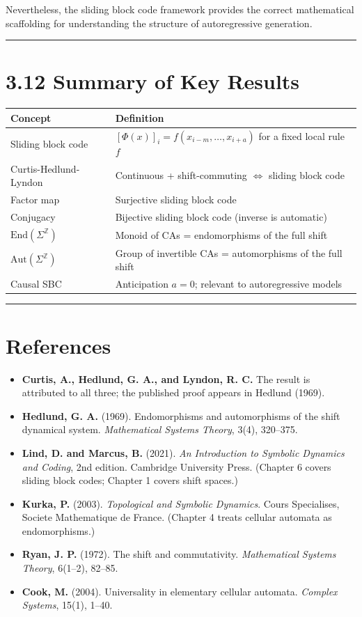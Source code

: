 Nevertheless, the sliding block code framework provides the correct mathematical scaffolding for understanding the structure of autoregressive generation.

\bigskip\hrule\bigskip

\section{3.12 Summary of Key Results}

\begin{tabular}{|l|l|}
\hline
Concept & Definition \\
\hline
Sliding block code & $[\Phi(x)]_i = f(x_{i-m}, \ldots, x_{i+a})$ for a fixed local rule $f$ \\
Curtis-Hedlund-Lyndon & Continuous + shift-commuting $\iff$ sliding block code \\
Factor map & Surjective sliding block code \\
Conjugacy & Bijective sliding block code (inverse is automatic) \\
$\text{End}(\Sigma^\mathbb{Z})$ & Monoid of CAs = endomorphisms of the full shift \\
$\text{Aut}(\Sigma^\mathbb{Z})$ & Group of invertible CAs = automorphisms of the full shift \\
Causal SBC & Anticipation $a = 0$; relevant to autoregressive models \\
\hline
\end{tabular}


\bigskip\hrule\bigskip

\section{References}

\begin{itemize}
  \item \textbf{Curtis, A., Hedlund, G. A., and Lyndon, R. C.} The result is attributed to all three; the published proof appears in Hedlund (1969).
  \item \textbf{Hedlund, G. A.} (1969). Endomorphisms and automorphisms of the shift dynamical system. \textit{Mathematical Systems Theory}, 3(4), 320--375.
  \item \textbf{Lind, D. and Marcus, B.} (2021). \textit{An Introduction to Symbolic Dynamics and Coding}, 2nd edition. Cambridge University Press. (Chapter 6 covers sliding block codes; Chapter 1 covers shift spaces.)
  \item \textbf{Kurka, P.} (2003). \textit{Topological and Symbolic Dynamics}. Cours Specialises, Societe Mathematique de France. (Chapter 4 treats cellular automata as endomorphisms.)
  \item \textbf{Ryan, J. P.} (1972). The shift and commutativity. \textit{Mathematical Systems Theory}, 6(1--2), 82--85.
  \item \textbf{Cook, M.} (2004). Universality in elementary cellular automata. \textit{Complex Systems}, 15(1), 1--40.
\end{itemize}
